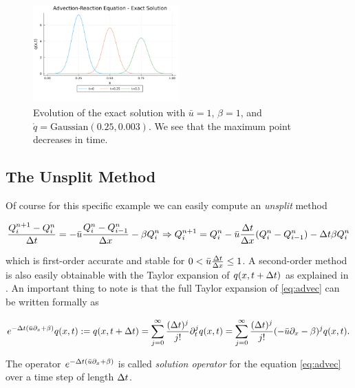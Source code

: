 \documentclass[journal,onecolumn]{IEEEtran}
\begin{document}
\begin{figure}[!ht]
	\centering
	\includegraphics[width=0.5\textwidth]{Advection.png}
	\caption{Evolution of the exact solution with $\bar{u}=1$, $\beta=1$, and $\mathring{q}=\text{Gaussian}(0.25,0.003)$. We see that the maximum point decreases in time.}
	\label{fig:exact}
\end{figure}

\subsection{The Unsplit Method}

Of course for this specific example we can easily compute an \textit{unsplit} method

\begin{equation}\label{eq:unsplit}
	\frac{Q^{n+1}_i-Q^n_i}{\Delta t} = -\bar{u} \frac{Q^n_i-Q^n_{i-1}}{\Delta x}-\beta Q^n_i \Rightarrow Q^{n+1}_i = Q^n_i-\bar{u} \frac{\Delta t}{\Delta x}(Q^n_i-Q^n_{i-1})-\Delta t\beta Q^n_i
\end{equation}

which is first-order accurate and stable for $0<\bar{u}\frac{\Delta t}{\Delta x}\leq1$.
A second-order method is also easily obtainable with the Taylor expansion of $q(x,t+\Delta t)$ as explained in \cite{leveque}. An important thing to note is that the full Taylor expansion of \eqref{eq:advec} can be written formally as

\begin{equation}\label{eq:sol_op}
	e^{-\Delta t(\bar{u}\partial_x+\beta)}q(x,t):=q(x,t+\Delta t)=\sum_{j=0}^{\infty}\frac{(\Delta t)^j}{j!}\partial_t^jq(x,t)=\sum_{j=0}^{\infty}\frac{(\Delta t)^j}{j!}(-\bar{u}\partial_x-\beta)^jq(x,t).
\end{equation}

The operator $e^{-\Delta t(\bar{u}\partial_x+\beta)}$ is called \textit{solution operator} for the equation \eqref{eq:advec} over a time step of length $\Delta t$.
\end{document}
